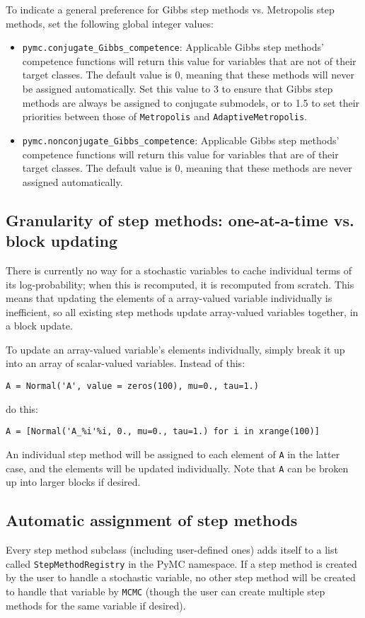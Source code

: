 To indicate a general preference for Gibbs step methods vs. Metropolis step methods, set the following global integer values:
\begin{itemize}
    \item \texttt{pymc.conjugate_Gibbs_competence}: Applicable Gibbs step methods' competence functions will return this value for variables that are not of their target classes. The default value is 0, meaning that these methods will never be assigned automatically. Set this value to 3 to ensure that Gibbs step methods are always be assigned to conjugate submodels, or to 1.5 to set their priorities between those of \texttt{Metropolis} and \texttt{AdaptiveMetropolis}.
    \item \texttt{pymc.nonconjugate_Gibbs_competence}: Applicable Gibbs step methods' competence functions will return this value for variables that are of their target classes. The default value is 0, meaning that these methods are never assigned automatically.
\end{itemize}


\subsection*{Granularity of step methods: one-at-a-time vs. block updating} 
There is currently no way for a stochastic variables to cache individual terms of its log-probability; when this is recomputed, it is recomputed from scratch. This means that updating the elements of a array-valued variable individually is inefficient, so all existing step methods update array-valued variables together, in a block update.

To update an array-valued variable's elements individually, simply break it up into an array of scalar-valued variables. Instead of this:
\begin{verbatim}
A = Normal('A', value = zeros(100), mu=0., tau=1.)    
\end{verbatim}
do this:
\begin{verbatim}
A = [Normal('A_%i'%i, 0., mu=0., tau=1.) for i in xrange(100)]
\end{verbatim}
An individual step method will be assigned to each element of \texttt{A} in the latter case, and the elements will be updated individually. Note that \texttt{A} can be broken up into larger blocks if desired.

\subsection*{Automatic assignment of step methods} 
Every step method subclass (including user-defined ones) adds itself to a list called \texttt{StepMethodRegistry} in the PyMC namespace. If a step method is created by the user to handle a stochastic variable, no other step method will be created to handle that variable by \texttt{MCMC} (though the user can create multiple step methods for the same variable if desired). 

